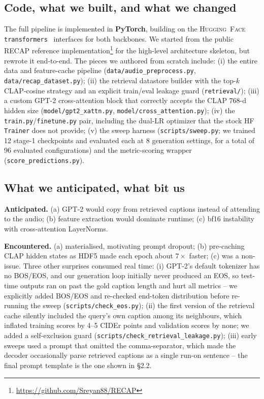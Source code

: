\documentclass[10pt,twocolumn,letterpaper]{article}
\begin{document}
\subsection{Code, what we built, and what we changed}
The full pipeline is implemented in \textbf{PyTorch}, building on
the \textsc{Hugging~Face} \texttt{transformers}~\cite{wolf2020transformers}
interfaces for both backbones. We started from the public RECAP reference
implementation\footnote{\url{https://github.com/Sreyan88/RECAP}} for the
high-level architecture skeleton, but rewrote it end-to-end. The pieces we
authored from scratch include: (i) the entire data and feature-cache pipeline
(\texttt{data/audio\_preprocess.py}, \texttt{data/recap\_dataset.py});
(ii) the retrieval datastore builder with the top-$k$ CLAP-cosine strategy
and an explicit train/eval leakage guard (\texttt{retrieval/}); (iii) a
custom GPT-2 cross-attention block that correctly accepts the CLAP $768$-d
hidden size (\texttt{model/gpt2\_xattn.py}, \texttt{model/cross\_attention.py});
(iv) the \texttt{train.py}/\texttt{finetune.py} pair, including the dual-LR
optimizer that the stock \textsc{HF} \texttt{Trainer} does not provide;
(v) the sweep harness (\texttt{scripts/sweep.py}; we trained 12 stage-1
checkpoints and evaluated each at 8 generation settings, for a total of 96
evaluated configurations) and the metric-scoring wrapper
(\texttt{score\_predictions.py}).

\subsection{What we anticipated, what bit us}
\textbf{Anticipated.} (a) GPT-2 would copy from retrieved captions instead of
attending to the audio; (b) feature extraction would dominate runtime;
(c) bf16 instability with cross-attention LayerNorms.

\textbf{Encountered.} (a) materialised, motivating prompt dropout; (b)
pre-caching CLAP hidden states as HDF5 made each epoch about $7\times$ faster;
(c) was a non-issue. Three other surprises consumed real time: (i) GPT-2's
default tokenizer has no BOS/EOS, and our generation loop initially never
produced an EOS, so test-time outputs ran on past the gold caption length and
hurt all metrics -- we explicitly added BOS/EOS and re-checked end-token
distribution before re-running the sweep
(\texttt{scripts/check\_eos.py}); (ii) the first version of the retrieval
cache silently included the query's own caption among its neighbours, which
inflated training scores by 4--5 CIDEr points and validation scores by
none; we added a self-exclusion guard
(\texttt{scripts/check\_retrieval\_leakage.py}); (iii) early sweeps used a
prompt that omitted the comma-separator, which made the decoder occasionally
parse retrieved captions as a single run-on sentence -- the final prompt
template is the one shown in \S2.2.
\end{document}
